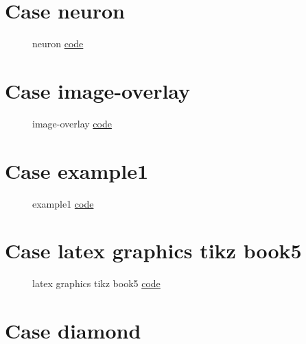 \documentclass{article}
\begin{document}
\section{Case neuron}

\begin{figure}[H]
    \centering
    
    \caption{neuron \href{https:/github.com/cauliyang/learn_tikz/blob/main/source/neuron.tex}{code} }
    \label{fig:neuron}
\end{figure}
    
\section{Case image-overlay}

\begin{figure}[H]
    \centering
    
    \caption{image-overlay \href{https:/github.com/cauliyang/learn_tikz/blob/main/source/image-overlay.tex}{code} }
    \label{fig:image-overlay}
\end{figure}
    
\section{Case example1}

\begin{figure}[H]
    \centering
    
    \caption{example1 \href{https:/github.com/cauliyang/learn_tikz/blob/main/source/example1.tex}{code} }
    \label{fig:example1}
\end{figure}
    
\section{Case latex graphics tikz book5}

\begin{figure}[H]
    \centering
    
    \caption{latex graphics tikz book5 \href{https:/github.com/cauliyang/learn_tikz/blob/main/source/latex_graphics_tikz_book5.tex}{code} }
    \label{fig:latex graphics tikz book5}
\end{figure}
    
\section{Case diamond}
\end{document}
